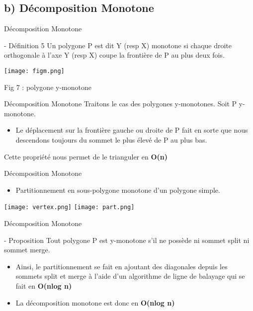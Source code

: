 \documentclass{beamer}
\begin{document}
\subsection{b) Décomposition Monotone}
\begin{frame}{Décomposition Monotone}
    \begin{block}{- Définition 5}
     Un polygone P est dit Y (resp X) monotone si chaque droite orthogonale à l'axe Y (resp X) coupe la frontière de P au plus deux fois.
    \end{block}
    \begin{center}
        \texttt{[image: figm.png]}

        Fig 7 : polygone y-monotone
    \end{center}
\end{frame}
\begin{frame}{Décomposition Monotone}
    Traitons le cas des polygones y-monotones. \newline\newline
    Soit P y-monotone.\newline
    \begin{itemize}
        \item Le déplacement sur la frontière gauche ou droite de P fait en sorte que nous descendons toujours du sommet le plus élevé de P au plus bas.\newline\newline
    \end{itemize}
    Cette propriété nous permet de le trianguler en \textbf{O(n)}
\end{frame}
\begin{frame}{Décomposition Monotone}
    \begin{itemize}
        \item Partitionnement en sous-polygone monotone d'un polygone simple.
    \end{itemize}
    \begin{center}
        \texttt{[image: vertex.png]}
        \texttt{[image: part.png]}
    \end{center}
\end{frame}
\begin{frame}{Décomposition Monotone}
    \begin{block}{- Proposition}
        Tout polygone P est  y-monotone s'il ne possède ni sommet split ni sommet merge.\newline\newline 
    \end{block}
    \begin{itemize}
        \item Ainsi, le partitionnement se fait en ajoutant des diagonales depuis les sommets split et merge à l'aide d'un algorithme de ligne de balayage qui se fait en \textbf{O(nlog n)} \newline\newline
        \item La décomposition monotone est donc en \textbf{O(nlog n)}
    \end{itemize}
\end{frame}
\end{document}
